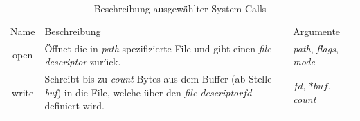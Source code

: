         \begin{table}[ht]
            \label{tab:syscall}
            \centering
            \begin{tabular}{c||p{6cm}|p{3cm}}
                \hline
                \rowcolor{Gray!36}
                \multicolumn{3}{c}{System Calls}\\
                \hline
                Name & Beschreibung & Argumente \\
                \hline
                \rowcolor{Gray!16}
                open& Öffnet die in \textit{path} spezifizierte File und gibt einen \textit{file descriptor} zurück.& \textit{path}, \textit{flags}, \textit{mode} \\
                write& Schreibt bis zu \textit{count} Bytes aus dem Buffer (ab Stelle \textit{buf}) in die File, welche über den \textit{file descriptor}$fd$ definiert wird. & $fd$, $*buf$, \textit{count} \\
                \hline
            \end{tabular}
            \caption{Beschreibung ausgewählter System Calls}
        \end{table}

